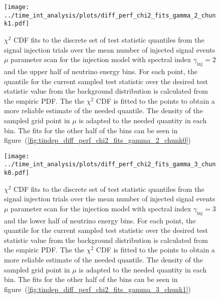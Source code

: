 \begin{figure}[H]
  \centering
  \texttt{[image: ../time\_int\_analysis/plots/diff\_perf\_chi2\_fits\_gamma\_2\_chunk1.pdf]}
  \caption[$\chi^2$ CDF fits for the time-integrated diff. performance, $\gamma_\text{inj}=2$ -- part 2]{
     $\chi^2$ CDF fits to the discrete set of test statistic quantiles from the signal injection trials over the mean number of injected signal events $\mu$ parameter scan for the injection model with spectral index $\gamma_\text{inj}=2$ and the upper half of neutrino energy bins.
     For each point, the quantile for the current sampled test statistic over the desired test statistic value from the background distribution is calculated from the empiric PDF.
     The the $\chi^2$ CDF is fitted to the points to obtain a more reliable estimate of the needed quantile.
     The density of the sampled grid point in $\mu$ is adapted to the needed quantity in each bin.
     The fits for the other half of the bins can be seen in figure~(\ref{fig:tindep_diff_perf_chi2_fits_gamma_2_chunk0})
  }
  \label{fig:tindep_diff_perf_chi2_fits_gamma_2_chunk1}
\end{figure}

\begin{figure}[H]
  \centering
  \texttt{[image: ../time\_int\_analysis/plots/diff\_perf\_chi2\_fits\_gamma\_3\_chunk0.pdf]}
  \caption[$\chi^2$ CDF fits for the time-integrated diff. performance, $\gamma_\text{inj}=3$ -- part 1]{
     $\chi^2$ CDF fits to the discrete set of test statistic quantiles from the signal injection trials over the mean number of injected signal events $\mu$ parameter scan for the injection model with spectral index $\gamma_\text{inj}=3$ and the lower half of neutrino energy bins.
     For each point, the quantile for the current sampled test statistic over the desired test statistic value from the background distribution is calculated from the empiric PDF.
     The the $\chi^2$ CDF is fitted to the points to obtain a more reliable estimate of the needed quantile.
     The density of the sampled grid point in $\mu$ is adapted to the needed quantity in each bin.
     The fits for the other half of the bins can be seen in figure~(\ref{fig:tindep_diff_perf_chi2_fits_gamma_3_chunk1})
  }
  \label{fig:tindep_diff_perf_chi2_fits_gamma_3_chunk0}
\end{figure}

